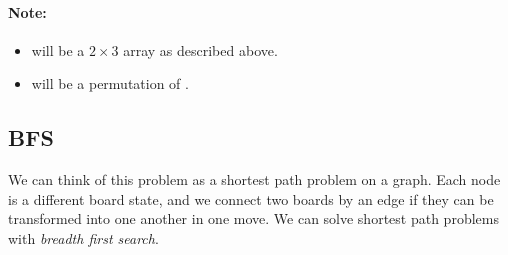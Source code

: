 \paragraph{Note:}

\begin{itemize}
\item {} will be a $2 \times 3$ array as described above.
\item {} will be a permutation of \fcj{[0, 1, 2, 3, 4, 5]}.
\end{itemize}

\subsection{BFS}
We can think of this problem as a shortest path problem on a graph. Each node is a different board state, and we connect two boards by an edge if they can be transformed into one another in one move. We can solve shortest path problems with \textit{breadth first search}.

